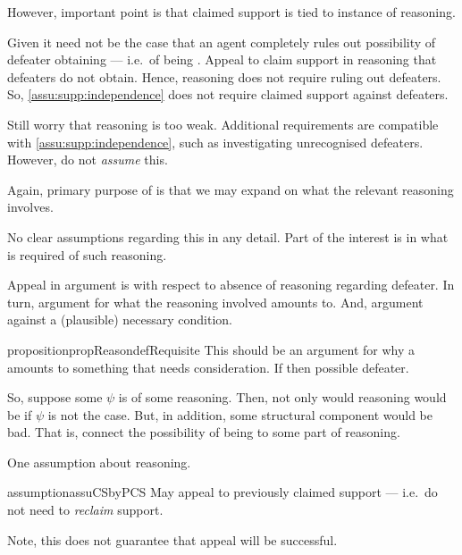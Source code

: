 \begin{note}
  However, important point is that claimed support is tied to instance of reasoning.

  Given \nfcs{} it need not be the case that an agent completely rules out possibility of defeater obtaining --- i.e.\ of being \mom{}.
  Appeal to claim support in reasoning that defeaters do not obtain.
  Hence, reasoning does not require ruling out defeaters.
  So, \autoref{assu:supp:independence} does not require claimed support against defeaters.

  Still worry that reasoning is too weak.
  Additional requirements are compatible with \autoref{assu:supp:independence}, such as investigating unrecognised defeaters.
  However, do not \emph{assume} this.

  Again, primary purpose of \eiS{} is that we may expand on what the relevant reasoning involves.

  No clear assumptions regarding this in any detail.
  Part of the interest is in what is required of such reasoning.

  Appeal in argument is with respect to absence of reasoning regarding defeater.
  In turn, argument for what the reasoning involved amounts to.
  And, argument against a (plausible) necessary condition.
\end{note}


\begin{note}
  \begin{restatable}[]{proposition}{propReasondefRequisite}\label{prop:reason-requ}
    {
      \color{red} This should be an argument for why a \requ{} amounts to something that needs consideration.
    }
    If \requ{} then possible defeater.
  \end{restatable}

  So, suppose some \(\psi\) is \requ{} of some reasoning.
  Then, not only would reasoning would be \mom{} if \(\psi\) is not the case.
  But, in addition, some structural component would be bad.
  That is, connect the possibility of being \mom{} to some part of reasoning.
\end{note}

\begin{note}
  One assumption about reasoning.
  \begin{restatable}{assumption}{assuCSbyPCS}\label{assu:appeal-to-previous-CS}
    May appeal to previously claimed support --- i.e.\ do not need to \emph{reclaim} support.
  \end{restatable}

  Note, this does not guarantee that appeal will be successful.
\end{note}

